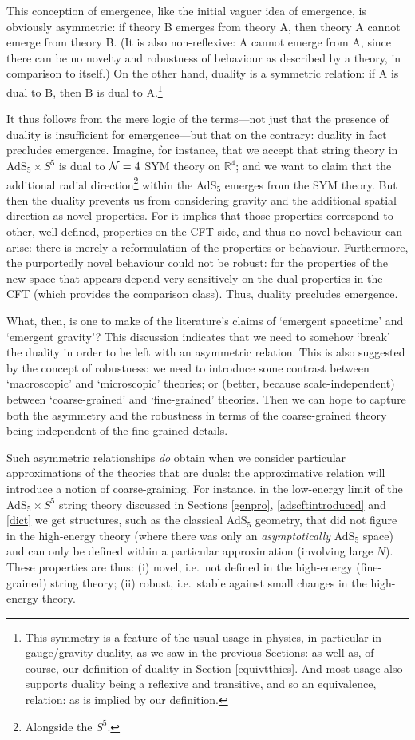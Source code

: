 \documentclass[12pt]{article}
\renewcommand{\^}[1]{\hat{#1}}
\begin{document}
This conception of emergence, like the initial vaguer idea of emergence, is obviously asymmetric: if theory B emerges from theory A, then theory A cannot emerge from theory B. (It is also non-reflexive: A cannot emerge from A, since there can be no novelty and robustness of behaviour as described by a theory, in comparison to itself.) On the other hand, duality is a symmetric relation: if A is dual to B, then B is dual to A.\footnote{This symmetry is a feature of the usual usage in physics, in particular in gauge/gravity duality, as we saw in the previous Sections: as well as, of course, our definition of duality in Section \ref{equivtthies}. And most usage also supports duality being a reflexive and transitive, and so an equivalence, relation: as is implied by our definition.}
  
It thus follows from the mere logic of the terms---not just that the presence of duality is insufficient for emergence---but that on the contrary: duality in fact precludes emergence. Imagine, for instance, that we accept that string theory in AdS$_5\times S^5$ is dual to ${\cal N}=4$ SYM theory on ${\mathbb R}^4$; and we want to claim that the additional radial direction\footnote{Alongside the $S^5$.} within the AdS$_5$ emerges from the SYM theory. But then the duality prevents us from considering gravity and the additional spatial direction as novel properties. For it implies that those properties correspond to other, well-defined, properties on the CFT side, and thus no novel behaviour can arise: there is merely a reformulation of the properties or behaviour. Furthermore, the purportedly novel behaviour could not be robust: for the properties of the new space that appears depend very sensitively  on the dual properties in the CFT (which provides the comparison class). Thus, duality precludes emergence. 

What, then, is one to make of the literature's claims of `emergent spacetime' and `emergent gravity'? This discussion  indicates that we need to somehow `break' the duality in order to be left with an asymmetric relation. This is also suggested by the concept of robustness: we need to introduce some contrast between `macroscopic' and `microscopic' theories; or (better, because scale-independent) between `coarse-grained' and `fine-grained' theories. Then we can hope to capture both the asymmetry and the robustness in terms of the coarse-grained theory being independent of the fine-grained details. 

Such asymmetric relationships {\em do} obtain when we consider particular approximations of the theories that are duals: the approximative relation will introduce a notion of coarse-graining. For instance, in the low-energy limit of the AdS$_5\times S^5$ string theory discussed in Sections \ref{genpro}, \ref{adscftintroduced} and \ref{dict} we get structures, such as the classical AdS$_5$ geometry, that did not figure in the high-energy theory (where there was only an {\it asymptotically} AdS$_5$ space) and can only be defined within a particular approximation (involving large $N$). These properties are thus: (i) novel, i.e.~not defined in the high-energy (fine-grained) string theory; (ii) robust, i.e.~stable against small changes in the high-energy theory. 
\end{document}
